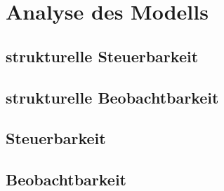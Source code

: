 \chapter{Analyse des Modells}

\section{strukturelle Steuerbarkeit}
\section{strukturelle Beobachtbarkeit}
\section{Steuerbarkeit}
\section{Beobachtbarkeit}